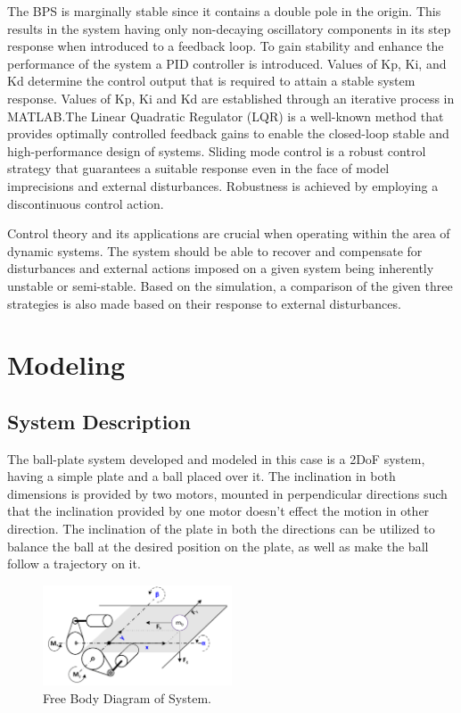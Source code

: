 \documentclass[conference]{IEEEtran}
\begin{document}
The  BPS is marginally stable since it contains a double pole in the origin. This results in the system having only non-decaying oscillatory components in its step response when introduced to a feedback loop. To gain stability and enhance the performance of the system a PID controller is introduced. Values of Kp, Ki, and Kd determine the control output that is required to attain a stable system response. Values of Kp, Ki and Kd are established through an iterative process in MATLAB.The Linear Quadratic Regulator (LQR) is a well-known method that provides optimally controlled feedback gains to enable the closed-loop stable and high-performance design of systems. Sliding mode control is a robust control strategy that guarantees a suitable response even in the face of model imprecisions and external disturbances. Robustness is achieved by employing a discontinuous control action.

Control theory and its applications are crucial when operating within the area of dynamic systems. The system should be able to recover and compensate for disturbances and external actions imposed on a given system being inherently unstable or semi-stable. Based on the simulation, a comparison of the given three strategies is also made based on their response to external disturbances. 



\section{Modeling}

\subsection{System Description}

The ball-plate system developed and modeled in this case is a 2DoF system, having a simple plate and a ball placed over it. The inclination in both dimensions is provided by two motors, mounted in perpendicular directions such that the inclination provided by one motor doesn’t effect the motion in other direction. The inclination of the plate in both the directions can be utilized to balance the ball at the desired position on the plate, as well as make the ball follow a trajectory on it.
\begin{figure}[htbp]
\centerline{\includegraphics[width=0.5\textwidth]{FBD.png}}
\caption{Free Body Diagram of System.}
\label{fig1}
\end{figure}
\end{document}

